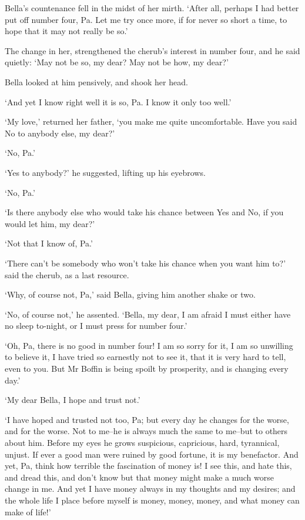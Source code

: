 Bella’s countenance fell in the midst of her mirth. ‘After all, perhaps
I had better put off number four, Pa. Let me try once more, if for never
so short a time, to hope that it may not really be so.’

The change in her, strengthened the cherub’s interest in number four,
and he said quietly: ‘May not be so, my dear? May not be how, my dear?’

Bella looked at him pensively, and shook her head.

‘And yet I know right well it is so, Pa. I know it only too well.’

‘My love,’ returned her father, ‘you make me quite uncomfortable. Have
you said No to anybody else, my dear?’

‘No, Pa.’

‘Yes to anybody?’ he suggested, lifting up his eyebrows.

‘No, Pa.’

‘Is there anybody else who would take his chance between Yes and No, if
you would let him, my dear?’

‘Not that I know of, Pa.’

‘There can’t be somebody who won’t take his chance when you want him
to?’ said the cherub, as a last resource.

‘Why, of course not, Pa,’ said Bella, giving him another shake or two.

‘No, of course not,’ he assented. ‘Bella, my dear, I am afraid I must
either have no sleep to-night, or I must press for number four.’

‘Oh, Pa, there is no good in number four! I am so sorry for it, I am so
unwilling to believe it, I have tried so earnestly not to see it, that
it is very hard to tell, even to you. But Mr Boffin is being spoilt by
prosperity, and is changing every day.’

‘My dear Bella, I hope and trust not.’

‘I have hoped and trusted not too, Pa; but every day he changes for
the worse, and for the worse. Not to me--he is always much the same
to me--but to others about him. Before my eyes he grows suspicious,
capricious, hard, tyrannical, unjust. If ever a good man were ruined by
good fortune, it is my benefactor. And yet, Pa, think how terrible the
fascination of money is! I see this, and hate this, and dread this, and
don’t know but that money might make a much worse change in me. And yet
I have money always in my thoughts and my desires; and the whole life I
place before myself is money, money, money, and what money can make of
life!’


